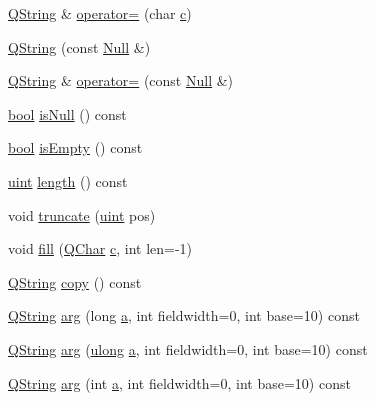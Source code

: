 \begin{DoxyCompactItemize}
\item 
\hyperlink{class_q_string}{Q\+String} \& \hyperlink{class_q_string_a8de95eb7bffbe1a58c5fb586192066e1}{operator=} (char \hyperlink{060__command__switch_8tcl_ab14f56bc3bd7680490ece4ad7815465f}{c})
\item 
\hyperlink{class_q_string_a8f4ed13204d5e42853176c0116a6e098}{Q\+String} (const \hyperlink{struct_q_string_1_1_null}{Null} \&)
\item 
\hyperlink{class_q_string}{Q\+String} \& \hyperlink{class_q_string_a70791ce01404480adbac0c524c3bd90a}{operator=} (const \hyperlink{struct_q_string_1_1_null}{Null} \&)
\item 
\hyperlink{qglobal_8h_a1062901a7428fdd9c7f180f5e01ea056}{bool} \hyperlink{class_q_string_abbd7059384540a4337dfb86362727507}{is\+Null} () const 
\item 
\hyperlink{qglobal_8h_a1062901a7428fdd9c7f180f5e01ea056}{bool} \hyperlink{class_q_string_a1538835dda5c7f24ae2854a92e806aea}{is\+Empty} () const 
\item 
\hyperlink{qglobal_8h_a4d3943ddea65db7163a58e6c7e8df95a}{uint} \hyperlink{class_q_string_a131b10981e8c68c2d291934c140be464}{length} () const 
\item 
void \hyperlink{class_q_string_a6a7546dfb7ad7b0e5d982078c03595db}{truncate} (\hyperlink{qglobal_8h_a4d3943ddea65db7163a58e6c7e8df95a}{uint} pos)
\item 
void \hyperlink{class_q_string_a261151b9ce7096b9af4a9588bb5d038a}{fill} (\hyperlink{class_q_char}{Q\+Char} \hyperlink{060__command__switch_8tcl_ab14f56bc3bd7680490ece4ad7815465f}{c}, int len=-\/1)
\item 
\hyperlink{class_q_string}{Q\+String} \hyperlink{class_q_string_a49a238770b983e10757ec2745b479849}{copy} () const 
\item 
\hyperlink{class_q_string}{Q\+String} \hyperlink{class_q_string_a25a17411e63da3b907b95af3d18c47d8}{arg} (long \hyperlink{060__command__switch_8tcl_ab08ae027fc5777bc4f0629f1b60b35db}{a}, int fieldwidth=0, int base=10) const 
\item 
\hyperlink{class_q_string}{Q\+String} \hyperlink{class_q_string_aefc5f707eab539341cf6af42f4a8eb6f}{arg} (\hyperlink{qglobal_8h_a718b4eb2652c286f4d42dc18a8e71a1a}{ulong} \hyperlink{060__command__switch_8tcl_ab08ae027fc5777bc4f0629f1b60b35db}{a}, int fieldwidth=0, int base=10) const 
\item 
\hyperlink{class_q_string}{Q\+String} \hyperlink{class_q_string_a4d51ee874f92f753721458f0b8d6dbd9}{arg} (int \hyperlink{060__command__switch_8tcl_ab08ae027fc5777bc4f0629f1b60b35db}{a}, int fieldwidth=0, int base=10) const 

\end{DoxyCompactItemize}
